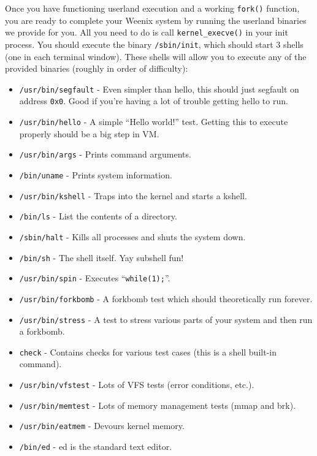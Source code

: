 Once you have functioning userland execution and a working \texttt{fork()} function, you are ready to complete your Weenix system by running the userland binaries we provide for you. All you need to do is call \texttt{kernel\_execve()} in your init process. You should execute the binary \texttt{/sbin/init}, which should start 3 shells (one in each terminal window). These shells will allow you to execute any of the provided binaries (roughly in order of difficulty):
\begin{itemize}
    \item \texttt{/usr/bin/segfault} - Even simpler than hello, this should just segfault on address \texttt{0x0}. Good if you're having a lot of trouble getting hello to run.
    \item \texttt{/usr/bin/hello} - A simple ``Hello world!'' test. Getting this to execute properly should be a big step in VM.
    \item \texttt{/usr/bin/args} - Prints command arguments.
    \item \texttt{/bin/uname} - Prints system information.
    \item \texttt{/usr/bin/kshell} - Traps into the kernel and starts a kshell.
    \item \texttt{/bin/ls} - List the contents of a directory.
    \item \texttt{/sbin/halt} - Kills all processes and shuts the system down.
    \item \texttt{/bin/sh} - The shell itself. Yay subshell fun!
    \item \texttt{/usr/bin/spin} - Executes ``\texttt{while(1);}''.
    \item \texttt{/usr/bin/forkbomb} - A forkbomb test which should theoretically run forever.
    \item \texttt{/usr/bin/stress} - A test to stress various parts of your system and then run a forkbomb.
    \item \texttt{check} - Contains checks for various test cases (this is a shell built-in command).
    \item \texttt{/usr/bin/vfstest} - Lots of VFS tests (error conditions, etc.).
    \item \texttt{/usr/bin/memtest} - Lots of memory management tests (mmap and brk).
    \item \texttt{/usr/bin/eatmem} - Devours kernel memory.
    \item \texttt{/bin/ed} - ed is the standard text editor.
\end{itemize}

